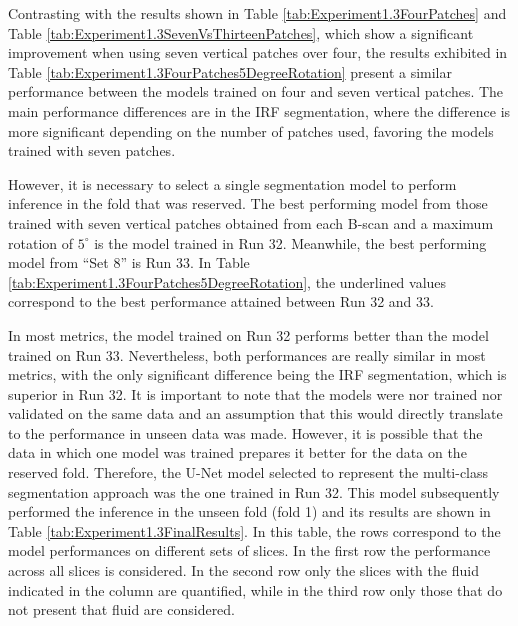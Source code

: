 Contrasting with the results shown in Table \ref{tab:Experiment1.3FourPatches} and Table \ref{tab:Experiment1.3SevenVsThirteenPatches}, which show a significant improvement when using seven vertical patches over four, the results exhibited in Table \ref{tab:Experiment1.3FourPatches5DegreeRotation} present a similar performance between the models trained on four and seven vertical patches. The main performance differences are in the IRF segmentation, where the difference is more significant depending on the number of patches used, favoring the models trained with seven patches.
\par
However, it is necessary to select a single segmentation model to perform inference in the fold that was reserved. The best performing model from those trained with seven vertical patches obtained from each B-scan and a maximum rotation of $5^{\circ}$ is the model trained in Run 32. Meanwhile, the best performing model from ``Set 8'' is Run 33. In Table \ref{tab:Experiment1.3FourPatches5DegreeRotation}, the underlined values correspond to the best performance attained between Run 32 and 33.
\par
In most metrics, the model trained on Run 32 performs better than the model trained on Run 33. Nevertheless, both performances are really similar in most metrics, with the only significant difference being the IRF segmentation, which is superior in Run 32. It is important to note that the models were nor trained nor validated on the same data and an assumption that this would directly translate to the performance in unseen data was made. However, it is possible that the data in which one model was trained prepares it better for the data on the reserved fold. Therefore, the U-Net model selected to represent the multi-class segmentation approach was the one trained in Run 32. This model subsequently performed the inference in the unseen fold (fold 1) and its results are shown in Table \ref{tab:Experiment1.3FinalResults}. In this table, the rows correspond to the model performances on different sets of slices. In the first row the performance across all slices is considered. In the second row only the slices with the fluid indicated in the column are quantified, while in the third row only those that do not present that fluid are considered.

